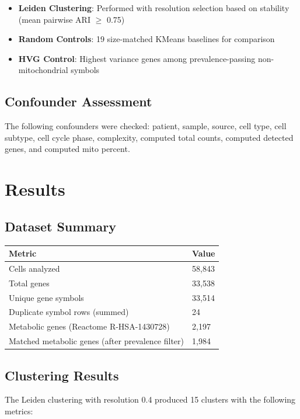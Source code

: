 \documentclass[11pt, a4paper]{article}
\begin{document}
\begin{itemize}
    \item \textbf{Leiden Clustering}: Performed with resolution selection based on stability (mean pairwise ARI $\ge$ 0.75)
    \item \textbf{Random Controls}: 19 size-matched KMeans baselines for comparison
    \item \textbf{HVG Control}: Highest variance genes among prevalence-passing non-mitochondrial symbols
\end{itemize}

\subsection{Confounder Assessment}

The following confounders were checked: patient, sample, source, cell type, cell subtype, cell cycle phase, complexity, computed total counts, computed detected genes, and computed mito percent.

\section{Results}

\subsection{Dataset Summary}

\begin{tabular}{ll}
\toprule
\textbf{Metric} & \textbf{Value} \\
\midrule
Cells analyzed & 58,843 \\
Total genes & 33,538 \\
Unique gene symbols & 33,514 \\
Duplicate symbol rows (summed) & 24 \\
Metabolic genes (Reactome R-HSA-1430728) & 2,197 \\
Matched metabolic genes (after prevalence filter) & 1,984 \\
\bottomrule
\end{tabular}

\subsection{Clustering Results}

The Leiden clustering with resolution 0.4 produced 15 clusters with the following metrics:
\end{document}

